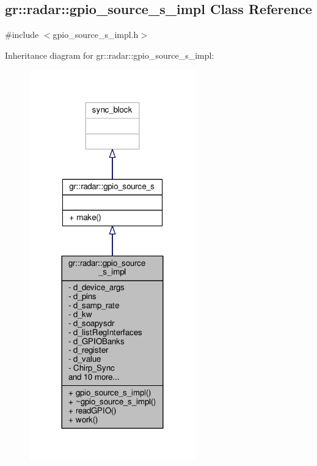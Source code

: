 \subsection{gr\+:\+:radar\+:\+:gpio\+\_\+source\+\_\+s\+\_\+impl Class Reference}
\label{classgr_1_1radar_1_1gpio__source__s__impl}


{\ttfamily \#include $<$gpio\+\_\+source\+\_\+s\+\_\+impl.\+h$>$}



Inheritance diagram for gr\+:\+:radar\+:\+:gpio\+\_\+source\+\_\+s\+\_\+impl\+:
\nopagebreak
\begin{figure}[H]
\begin{center}
\leavevmode
\includegraphics[width=204pt]{db/dc9/classgr_1_1radar_1_1gpio__source__s__impl__inherit__graph}
\end{center}
\end{figure}


